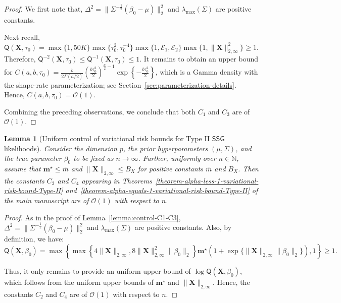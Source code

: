\documentclass[12pt]{article}
\newtheorem{lemma}{Lemma}[section]
\numberwithin{equation}{section}
\newcommand{\ssg}{\mathsf{SSG}}
\begin{document}
\begin{proof}
We first note that, $\Delta^{2} = \|\Sigma^{-\frac{1}{2}}(\beta_0-\mu)\|_{2}^{2}$ and $\lambda_{\max}(\Sigma)$ are positive constants.

Next recall, $\mathsf{Q}(\mathbf{X},\tau_0) = \max\{1,50K\}\max\{\tau_0^2,\tau_0^{-4}\}\max\{1,\mathscr{E}_1,\mathscr{E}_2\}\max\{1,\lVert\mathbf X\rVert_{2,\infty}^2\} \geq 1$. Therefore, $\mathsf{Q}^{-2}(\mathbf{X},\tau_0) \leq \mathsf{Q}^{-1}(\mathbf{X},\tau_0) \leq 1$.
It remains to obtain an upper bound for $C(a, b, \tau_0) = \tfrac{b}{2\Gamma(a/2)}\left(\tfrac{b\tau_0^2}{2}\right)^{\tfrac a2-1}\exp\left\{-\tfrac{b\tau_0^2}{2}\right\}$, which is a Gamma density with the shape-rate parameterization; see Section~\ref{sec:parameterization-details}. Hence, $C(a, b, \tau_0) = \mathcal{O}(1)$. 

Combining the preceding observations, we conclude that both $C_1$ and $C_3$ are of $\mathcal{O}(1)$.
\end{proof}

\begin{lemma}[Uniform control of variational risk bounds for Type II $\ssg$ likelihoods]
\label{lemma:control-C2-C4}
Consider the dimension $p$, the prior hyperparameters $(\mu, \Sigma)$, and the true parameter $\beta_0$ to be fixed as $n\to \infty$. Further, uniformly over $n\in \mathbb{N}$, assume that $\mathbf{m}^{\star} \leq \overline{m}$ and $\|\mathbf{X}\|_{2, \infty} \leq B_{X}$ for positive constants $\overline{m}$ and $B_X$.
Then the constants $C_2$ and $C_4$ appearing in Theorems~\ref{theorem-alpha-less-1-variational-risk-bound-Type-II} and~\ref{theorem-alpha-equals-1-variational-risk-bound-Type-II} of the main manuscript are of $\mathcal{O}(1)$ with respect to $n$.
\end{lemma}

\begin{proof}
As in the proof of Lemma~\ref{lemma:control-C1-C3}, $\Delta^{2} = \|\Sigma^{-\frac{1}{2}}(\beta_0-\mu)\|_{2}^{2}$ and $\lambda_{\max}(\Sigma)$ are positive constants. Also, by definition, we have:
$$\mathsf{Q}(\mathbf{X}, \beta_0) = \max\left\{\max\left\{4\lVert\mathbf{X}\rVert_{2, \infty}, 8\lVert\mathbf{X}\rVert_{2, \infty}^{2}\lVert\beta_0\rVert_{2}\right\}\mathbf{m}^{\star}\left(1 + \exp\{\lVert\mathbf{X}\rVert_{2, \infty}\lVert\beta_0\rVert_{2}\}\right),1\right\} \geq 1.$$

Thus, it only remains to provide an uniform upper bound of $\log \mathsf{Q}(\mathbf{X}, \beta_0)$, which follows from the uniform upper bounds of $\mathbf{m}^{\star}$ and $\|\mathbf X\|_{2,\infty}$. Hence, the constants $C_2$ and $C_4$ are of $\mathcal{O}(1)$ with respect to $n$.
\end{proof}
\end{document}
